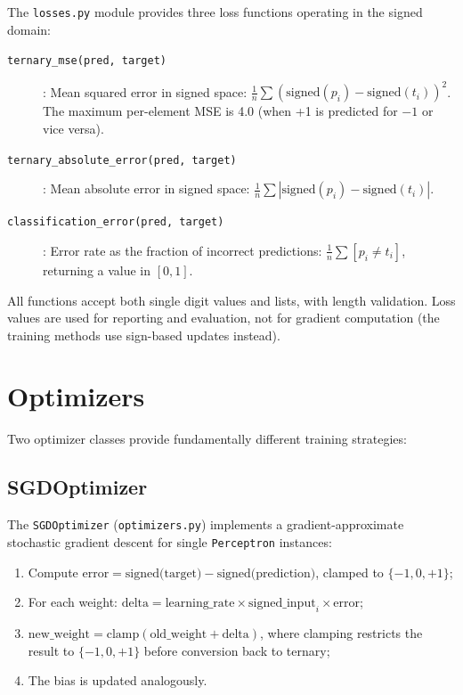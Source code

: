 \documentclass[10pt,a4paper,twoside]{book}
\begin{document}
The \texttt{losses.py} module provides three loss functions operating in
the signed domain:

\begin{description}
    \item[\texttt{ternary\_mse(pred, target)}]: Mean squared error in
          signed space:
          $\frac{1}{n}\sum (\text{signed}(p_i) - \text{signed}(t_i))^2$.
          The maximum per-element MSE is 4.0 (when +1 is predicted for
          $-1$ or vice versa).
    \item[\texttt{ternary\_absolute\_error(pred, target)}]: Mean absolute
          error in signed space:
          $\frac{1}{n}\sum |\text{signed}(p_i) - \text{signed}(t_i)|$.
    \item[\texttt{classification\_error(pred, target)}]: Error rate as
          the fraction of incorrect predictions:
          $\frac{1}{n}\sum [p_i \neq t_i]$, returning a value in $[0,1]$.
\end{description}

All functions accept both single digit values and lists, with length
validation. Loss values are used for reporting and evaluation, not for
gradient computation (the training methods use sign-based updates
instead).

\section{Optimizers}

Two optimizer classes provide fundamentally different training strategies:

\subsection{SGDOptimizer}

The \texttt{SGDOptimizer} (\texttt{optimizers.py}) implements a
gradient-approximate stochastic gradient descent for single
\texttt{Perceptron} instances:

\begin{enumerate}
    \item Compute $\text{error} = \text{signed(target)} -
          \text{signed(prediction)}$, clamped to $\{-1,0,+1\}$;
    \item For each weight:
          $\text{delta} = \text{learning\_rate} \times
          \text{signed\_input}_i \times \text{error}$;
    \item $\text{new\_weight} = \text{clamp}(\text{old\_weight} +
          \text{delta})$, where clamping restricts the result to
          $\{-1,0,+1\}$ before conversion back to ternary;
    \item The bias is updated analogously.
\end{enumerate}
\end{document}
